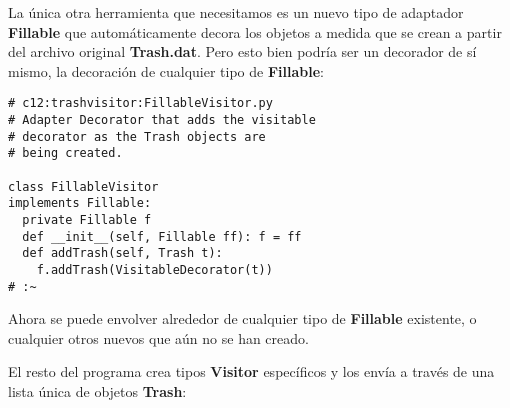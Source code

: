 La única otra herramienta que necesitamos es un nuevo tipo de adaptador \textbf{Fillable} que automáticamente decora los objetos a medida que se crean a partir del archivo original \textbf{Trash.dat}. Pero esto bien podría ser un decorador de sí mismo, la decoración de cualquier tipo de \textbf{Fillable}:        \newline

\begin{lstlisting} 
# c12:trashvisitor:FillableVisitor.py  
# Adapter Decorator that adds the visitable  
# decorator as the Trash objects are  
# being created. 

class FillableVisitor 
implements Fillable: 
  private Fillable f 
  def __init__(self, Fillable ff): f = ff  
  def addTrash(self, Trash t): 
    f.addTrash(VisitableDecorator(t)) 
# :~ 
\end{lstlisting}
Ahora se puede envolver alrededor de cualquier tipo de \textbf{Fillable} existente,  o cualquier otros nuevos que aún no se han creado. \newline

El resto del programa crea tipos \textbf{Visitor} específicos y los envía a través de una lista única de objetos \textbf{Trash}:   \newline

